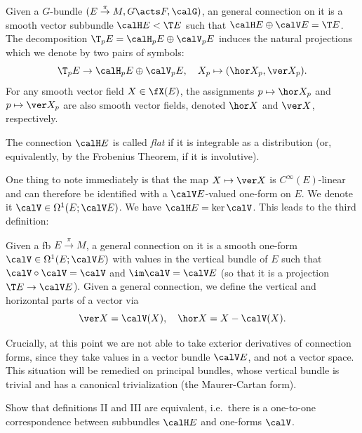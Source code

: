 \begin{defn}
    Given a $G$-bundle $(E\overset{\pi}{\to}M,G\acts F,\calG)$, an general connection on it is a smooth vector subbundle $\calH E<\T E$ such that $\calH E\oplus \calV E=\T E$. The decomposition $\T_pE=\calH_pE\oplus \calV_pE$ induces the natural projections which we denote by two pairs of symbols:
    \[\T_pE\to \calH_pE\oplus \calV_pE,\quad X_p\mapsto (\hor X_p,\ver X_p).\]
    For any smooth vector field $X\in\fX(E)$, the assignments $p\mapsto \hor X_p$ and $p\mapsto \ver X_p$ are also smooth vector fields, denoted $\hor X$ and $\ver X$, respectively.

    The connection $\calH E$ is called \emph{flat} if it is integrable as a distribution (or, equivalently, by the Frobenius Theorem, if it is involutive).
\end{defn}


One thing to note immediately is that the map $X\mapsto \ver X$ is  $C^\infty(E)$-linear and can therefore be identified with a $\calV E$-valued one-form on $E$. We denote it $\calV\in\Omega^1(E;\calV E)$. We have $\calH E=\ker \calV$. This leads to the third definition:

\begin{defn}
    Given a \gls{fb} $E\overset{\pi}{\to}M$, a general connection on it is a smooth one-form $\calV\in\Omega^1(E;\calV E)$ with values in the vertical bundle of $E$ such that $\calV\circ\calV=\calV$ and $\im\calV=\calV E$ (so that it is a projection $\T E\to \calV E$). Given a general connection, we define the vertical and horizontal parts of a vector via
    \[\ver X=\calV(X),\quad \hor X=X-\calV(X).\]
\end{defn}

\begin{rem}
    Crucially, at this point we are not able to take exterior derivatives of connection forms, since they take values in a vector bundle $\calV E$, and not a vector space. This situation will be remedied on principal bundles, whose vertical bundle is trivial and has a canonical trivialization (the Maurer-Cartan form).
\end{rem}

\begin{xca}
    Show that definitions II and III are equivalent, i.e.\ there is a one-to-one correspondence between subbundles $\calH E$ and one-forms $\calV$.
\end{xca}


